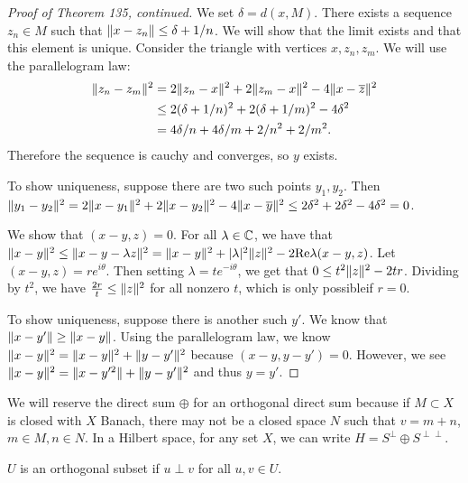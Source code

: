 \documentclass[10pt, twoside]{article}
\begin{document}
    \begin{proof}[Proof of Theorem 135, continued]
        We set $\delta = d(x,M)$. There exists a sequence $z_n \in M$ such that $\lVert x-z_n\rVert \leq \delta + 1/n$. We will show that the limit exists and that this element is unique. Consider the triangle with vertices $x, z_n, z_m$. We will use the parallelogram law:
        \begin{align*}
            \lVert z_n-z_m\rVert^2 &= 2 \lVert z_n-x\rVert^2 + 2\lVert z_m-x\rVert^2 - 4\lVert x-\overline{z}\rVert^2 \\
                             &\leq 2 (\delta + 1/n)^2 + 2 (\delta+1/m)^2 - 4 \delta^2 \\
                             &= 4 \delta/n + 4 \delta/m + 2/n^2 + 2/m^2.
        \end{align*}
        Therefore the sequence is cauchy and converges, so $y$ exists.

        To show uniqueness, suppose there are two such points $y_1, y_2$. Then $\lVert y_1-y_2\rVert^2 = 2 \lVert x-y_1\rVert^2 + 2 \lVert x-y_2\rVert^2 - 4\lVert x-\overline{y}\rVert^2 \leq 2 \delta^2 + 2 \delta^2 - 4 \delta^2 = 0$.

        We show that $(x-y,z) = 0$. For all $\lambda \in \mathbb{C}$, we have that $\lVert x-y\rVert^2 \leq \lVert x-y-\lambda z\rVert^2 = \lVert x-y\rVert^2 + \lvert\lambda\rvert^2 \lVert z\rVert^2 - 2 \mathrm{Re} \lambda (x-y,z)$. Let $(x-y,z) = re^{i\theta}$. Then setting $\lambda = te^{-i\theta}$, we get that $0 \leq t^2\lVert z\rVert^2 - 2tr$. Dividing by $t^2$, we have $\frac{2r}{t} \leq \lVert z\rVert^2$ for all nonzero $t$, which is only possibleif $r=0$.

        To show uniqueness, suppose there is another such $y'$. We know that $\lVert x-y'\rVert \geq \lVert x-y\rVert$. Using the parallelogram law, we know $\lVert x-y\rVert^2 = \lVert x-y\rVert^2 + \lVert y-y'\rVert^2$ because $(x-y, y-y') = 0$. However, we see $\lVert x-y\rVert^2 = \lVert x-y'^2\rVert + \lVert y-y'\rVert^2$ and thus $y=y'$.
    \end{proof}
    
    \begin{rmk}
        We will reserve the direct sum $\oplus$ for an orthogonal direct sum because if $M \subset X$ is closed with $X$ Banach, there may not be a closed space $N$ such that $v=m+n$, $m \in M, n \in N$. In a Hilbert space, for any set $X$, we can write $H = S^{\perp} \oplus S^{\perp\perp}$.
    \end{rmk}

    \begin{defn}
        $U$ is an orthogonal subset if $u \perp v$ for all $u,v \in U$.
    \end{defn}
\end{document}
